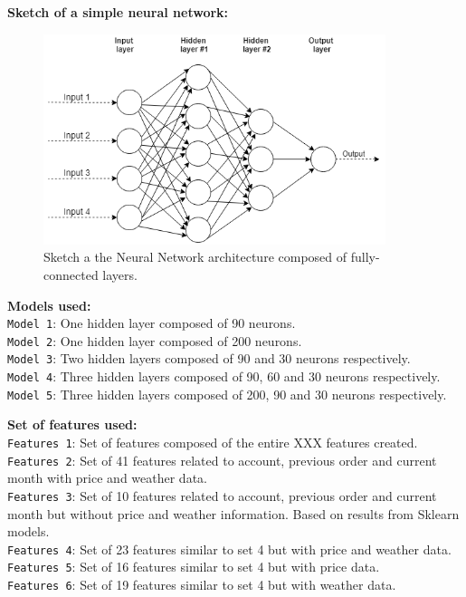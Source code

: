 \textbf{Sketch of a simple neural network:}
\begin{figure}[h]
    \centering
    \includegraphics[width=10cm]{images/nn-sketch.png}
    \caption{Sketch a the Neural Network architecture composed of fully-connected layers.}
    \label{fig-annex:nn-sketch}
\end{figure}

\noindent\textbf{Models used:}\\
\texttt{Model 1}: One hidden layer composed of 90 neurons. \\
\texttt{Model 2}: One hidden layer composed of 200 neurons. \\
\texttt{Model 3}: Two hidden layers composed of 90 and 30 neurons respectively. \\
\texttt{Model 4}: Three hidden layers composed of 90, 60 and 30 neurons respectively. \\
\texttt{Model 5}: Three hidden layers composed of 200, 90 and 30 neurons respectively. \\

\pagebreak

\noindent\textbf{Set of features used:}\\
\texttt{Features 1}: Set of features composed of the entire XXX features created. \\
\texttt{Features 2}: Set of 41 features related to account, previous order and current month with price and weather data. \\
\texttt{Features 3}: Set of 10 features related to account, previous order and current month but without price and weather information. Based on results from Sklearn models.\\
\texttt{Features 4}: Set of 23 features similar to set 4 but with price and weather data. \\
\texttt{Features 5}: Set of 16 features similar to set 4 but with price data. \\
\texttt{Features 6}: Set of 19 features similar to set 4 but with weather data. \\


